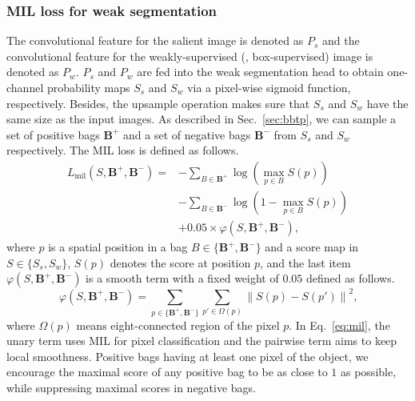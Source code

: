 \documentclass[final]{cvpr}
\begin{document}
\vspace{-3mm}
\subsubsection{MIL loss for weak segmentation}
\vspace{-2mm}
The convolutional feature for the salient image is denoted as $P_s$ and the convolutional feature for the weakly-supervised (\ie, box-supervised) image is denoted as $P_w$. $P_s$ and $P_w$ are fed into the weak segmentation head to obtain one-channel probability maps $S_s$ and $S_w$ via a pixel-wise sigmoid function, respectively. Besides, the upsample operation makes sure that $S_s$ and $S_w$ have the same size as the input images. As described in Sec.~\ref{sec:bbtp}, we can sample a set of positive bags $\mathbf{B}^+$ and a set of negative bags $\mathbf{B}^-$ from $S_s$ and $S_w$ respectively. The MIL loss is defined as follows.
\begin{equation}\label{eq:mil}
\begin{split}
    L_\text{mil}(S, \mathbf{B}^+, \mathbf{B}^-) = & -\sum_{B \in \mathbf{B}^+} \log \left( \max_{p \in B} S(p)  \right) \\
    & - \sum_{B \in \mathbf{B}^-} \log \left( 1 - \max_{p \in B}  S(p)  \right) \\
    & +  0.05\times\varphi(S, \mathbf{B}^+, \mathbf{B}^-) \text{,}
\end{split}
\end{equation}
where $p$ is a spatial position in a bag $B \in \{  \mathbf{B}^+, \mathbf{B}^- \}$ and a score map in $S \in \{S_s, S_w\}$, $S(p)$ denotes the score at position $p$, and the last item $\varphi(S, \mathbf{B}^+, \mathbf{B}^-)$ is a smooth term with a fixed weight of $0.05$ defined as follows. 
\begin{equation}\label{eq:smooth}
    \varphi(S, \mathbf{B}^+, \mathbf{B}^-) = \sum_{p\in \{ \mathbf{B}^+, \mathbf{B}^- \} } \sum_{p'\in{\Omega(p)}} {\|S(p)-S(p')\|}^2 \text{,}
\end{equation}
where $\Omega(p)$ means eight-connected region of the pixel $p$. In Eq.~\eqref{eq:mil}, the unary term uses MIL for pixel classification and the pairwise term aims to keep local smoothness. Positive bags having at least one pixel of the object, we encourage the maximal score of any positive bag to be as close to $1$ as possible, while suppressing maximal scores in negative bags.



\vspace{-3mm}
\end{document}
